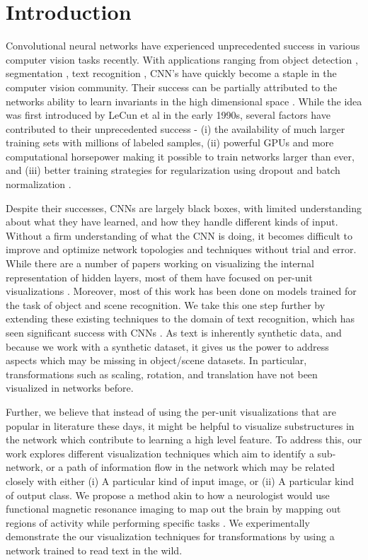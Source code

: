 \documentclass[10pt,twocolumn,letterpaper]{article}
\begin{document}
\section{Introduction}
Convolutional neural networks have experienced unprecedented success in various computer vision tasks recently.  With applications ranging from object detection \cite{krizhevsky2012imagenet}, segmentation \cite{DBLP:journals/corr/GirshickDDM13}, text recognition \cite{Jaderberg14d}, CNN's have quickly become a staple in the computer vision community. Their success can be partially attributed to the networks ability to learn invariants in the high dimensional space \cite{bengio2013representation}. While the idea was first introduced by LeCun et al in the early 1990s, several factors have contributed to their unprecedented success - (i) the availability of much larger training sets with millions of labeled samples, (ii) powerful GPUs and more computational horsepower making it possible to train networks larger than ever, and (iii) better training strategies for regularization using dropout \cite{wan2013regularization} and batch normalization \cite{ioffe2015batch}.


Despite their successes, CNNs are largely black boxes, with limited understanding about what they have learned, and how they handle different kinds of input. Without a firm understanding of what the CNN is doing, it becomes difficult to improve and optimize network topologies and techniques without trial and error. While there are a number of papers working on visualizing the internal representation of hidden layers, most of them have focused on per-unit visualizations \cite{yosinski2015understanding,mahendran2015understanding,zhou2014object}. Moreover, most of this work has been done on models trained for the task of object and scene recognition. We take this one step further by extending these existing techniques to the domain of text recognition, which has seen significant success with CNNs \cite{Jaderberg14,Jaderberg14c,Jaderberg14d}. As text is inherently synthetic data, and because we work with a synthetic dataset, it gives us the power to address aspects which may be missing in object/scene datasets. In particular, transformations such as scaling, rotation, and translation have not been visualized in networks before.


Further, we believe that instead of using the per-unit visualizations that are popular in literature these days, it might be helpful to visualize substructures in the network which contribute to learning a high level feature. To address this, our work explores different visualization techniques which aim to identify a sub-network, or a path of information flow in the network which may be related closely with either (i) A particular kind of input image, or (ii) A particular kind of output class. We propose a method akin to how a neurologist would use functional magnetic resonance imaging to map out the brain by mapping out regions of activity while performing specific tasks \cite{friston1998event}. We experimentally demonstrate the our visualization techniques for transformations by using a network trained to read text in the wild.
\end{document}
